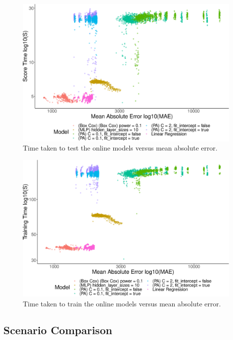 \documentclass[final,3p,times,twocolumn,numbers]{elsarticle}
\begin{document}
\begin{figure}[h]
\centering
\includegraphics[width=\columnwidth]{figures/results/online_testing_time_vs_mae_all_results_opaque.eps}
\caption{Time taken to test the online models versus mean absolute error.}
\label{fig:online_test_vs_mae}
\end{figure}

\begin{figure}[h]
\centering
\includegraphics[width=\columnwidth]{figures/results/online_training_time_vs_mae_all_results_opaque.eps}
\caption{Time taken to train the online models versus mean absolute error.}
\label{fig:online_train_vs_mae}
\end{figure}








\subsection{Scenario Comparison}
\end{document}
